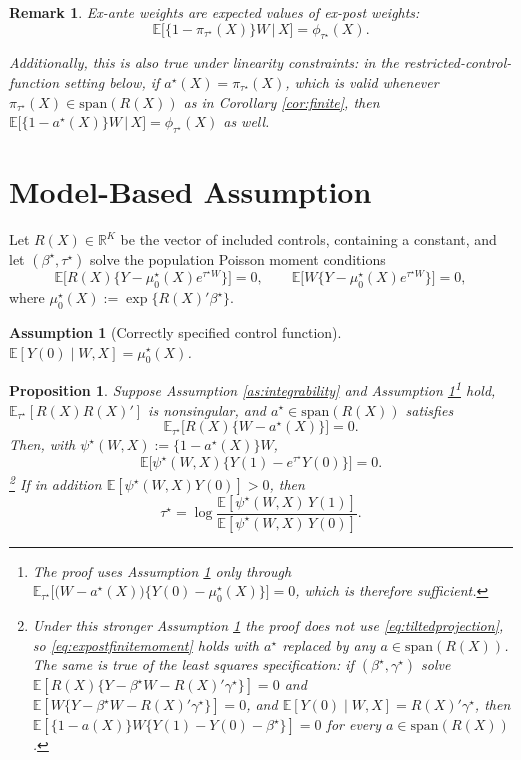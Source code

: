 \documentclass[11pt]{article}
\newtheorem{proposition}[theorem]{Proposition}
\newtheorem{remark}[theorem]{Remark}
\newtheorem{assumption}{Assumption}
\theoremstyle{definition}
\theoremstyle{plain}
\newcommand{\E}{\mathbb{E}}
\newcommand{\1}{\mathbf{1}}
\newcommand{\R}{\mathbb{R}}
\begin{document}
\begin{remark}
Ex-ante weights are expected values of ex-post weights:
\[
\E\big[\{1-\pi_{\tau^\star}(X)\}W \,\big|\, X\big] = \phi_{\tau^\star}(X) .
\]

Additionally, this is also true under linearity constraints: in the restricted-control-function setting below, if $a^\star(X)=\pi_{\tau^\star}(X)$, which is valid whenever $\pi_{\tau^\star}(X)\in\mathrm{span}(R(X))$ as in Corollary \ref{cor:finite}, then $\E\big[\{1-a^\star(X)\}W \,\big|\, X\big] = \phi_{\tau^\star}(X)$ as well.
\end{remark}

\section{Model-Based Assumption}
Let $R(X)\in\R^K$ be the vector of included controls, containing a constant, and let $(\beta^\star,\tau^\star)$ solve the population Poisson moment conditions
\begin{equation}
\E\Big[R(X)\bigl\{Y-\mu_0^\star(X)e^{\tau^\star W}\bigr\}\Big]=0,
\qquad
\E\Big[W\bigl\{Y-\mu_0^\star(X)e^{\tau^\star W}\bigr\}\Big]=0,
\label{eq:poissonFOC}
\end{equation}
where $\mu_0^\star(X):=\exp\{R(X)'\beta^\star\}$.

\begin{assumption}[Correctly specified control function]
\label{as:spanmeanindep}
$\E[Y(0)\mid W,X]=\mu_0^\star(X)$.
\end{assumption}

\begin{proposition}
\label{prop:expostfinite}
Suppose Assumption \ref{as:integrability} and Assumption \ref{as:spanmeanindep}\footnote{The proof uses Assumption \ref{as:spanmeanindep} only through $\E_{\tau^\star}\bigl[\bigl(W-a^\star(X)\bigr)\bigl\{Y(0)-\mu_0^\star(X)\bigr\}\bigr]=0$, which is therefore sufficient.} hold, $\E_{\tau^\star}[R(X)R(X)']$ is nonsingular, and $a^\star\in\mathrm{span}(R(X))$ satisfies
\begin{equation}
\E_{\tau^\star}\Big[R(X)\bigl\{W-a^\star(X)\bigr\}\Big]=0 .
\label{eq:tiltedprojection}
\end{equation}
Then, with $\psi^\star(W,X):=\bigl\{1-a^\star(X)\bigr\}W$,
\begin{equation}
\E\Big[\psi^\star(W,X)\bigl\{Y(1)-e^{\tau^\star}Y(0)\bigr\}\Big]=0 .
\label{eq:expostfinitemoment}
\end{equation}\footnote{Under this stronger Assumption \ref{as:spanmeanindep} the proof does not use \eqref{eq:tiltedprojection}, so \eqref{eq:expostfinitemoment} holds with $a^\star$ replaced by any $a\in\mathrm{span}(R(X))$.  The same is true of the least squares specification: if $(\beta^\star,\gamma^\star)$ solve $\E[R(X)\{Y-\beta^\star W-R(X)'\gamma^\star\}]=0$ and $\E[W\{Y-\beta^\star W-R(X)'\gamma^\star\}]=0$, and $\E[Y(0)\mid W,X]=R(X)'\gamma^\star$, then $\E[\{1-a(X)\}W\{Y(1)-Y(0)-\beta^\star\}]=0$ for every $a\in\mathrm{span}(R(X))$.}
If in addition $\E[\psi^\star(W,X)Y(0)]>0$, then
\[
\tau^\star=\log\frac{\E[\psi^\star(W,X)\,Y(1)]}{\E[\psi^\star(W,X)\,Y(0)]} .
\]
\end{proposition}
\end{document}

